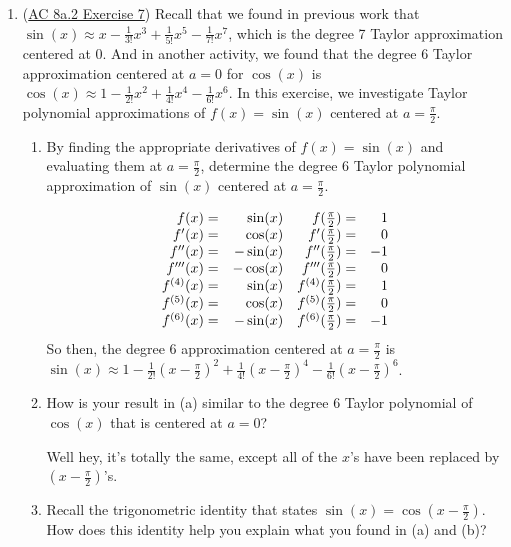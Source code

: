 \begin{enumerate}[leftmargin=0pt]
\item (\href{https://faculty.gvsu.edu/boelkinm/Home/ACS/sec-8a-2-taylor-poly.html#ez-8a-2-2}{AC 8a.2 Exercise 7}) Recall that we found in previous work that $\sin(x) \approx x - \tfrac{1}{3!}x^3 + \tfrac{1}{5!}x^5 - \tfrac{1}{7!}x^7$, which is the degree 7 Taylor approximation centered at 0. And in another activity, we found that the degree 6 Taylor approximation centered at $a=0$ for $\cos(x)$ is $\cos(x) \approx 1 - \tfrac{1}{2!}x^2 + \tfrac{1}{4!}x^4 - \tfrac{1}{6!}x^6$. In this exercise, we investigate Taylor polynomial approximations of $f(x) = \sin(x)$ centered at $a=\tfrac\pi2$.

\begin{enumerate}
    \item By finding the appropriate derivatives of $f(x) = \sin(x)$ and evaluating them at $a=\tfrac\pi2$, determine the degree 6 Taylor polynomial approximation of $\sin(x)$ centered at $a=\tfrac\pi2$.
    
    \begin{red}
    \[
\begin{array}{rr rr}
f(x)       =& \sin(x)  & f(\tfrac\pi2)  =& 1  \\
f'(x)      =& \cos(x)  & f'(\tfrac\pi2) =& 0  \\
f''(x)     =& -\sin(x) & f''(\tfrac\pi2)               =& -1 \\
f'''(x)    =& -\cos(x) & f'''(\tfrac\pi2)               =& 0  \\
f^{(4)}(x) =& \sin(x)  & f^{(4)}(\tfrac\pi2)               =& 1  \\
f^{(5)}(x) =& \cos(x)  & f^{(5)}(\tfrac\pi2)               =& 0  \\
f^{(6)}(x) =& -\sin(x) & f^{(6)}(\tfrac\pi2)               =& -1
\end{array}
    \]
    So then, the degree 6 approximation centered at $a=\frac\pi2$ is
    $\sin(x) \approx 1 
    - \frac{1}{2!} \left(x-\frac\pi2\right)^2
    + \frac{1}{4!} \left(x-\frac\pi2\right)^4
    - \frac{1}{6!} \left(x-\frac\pi2\right)^6
    $.
    \end{red}
    \item How is your result in (a) similar to the degree 6 Taylor polynomial of $\cos(x)$ that is centered at $a=0$?
    
    \begin{red}
    Well hey, it's totally the same, except all of the $x$'s have been replaced by $\left(x-\frac{\pi}{2}\right)$'s.
    \end{red}
    \item Recall the trigonometric identity that states $\sin(x) = \cos(x-\tfrac\pi2)$. How does this identity help you explain what you found in (a) and (b)?
    

\end{enumerate}
\end{enumerate}
